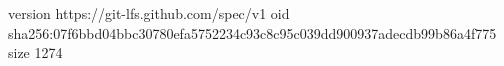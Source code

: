 version https://git-lfs.github.com/spec/v1
oid sha256:07f6bbd04bbc30780efa5752234c93c8c95c039dd900937adecdb99b86a4f775
size 1274
